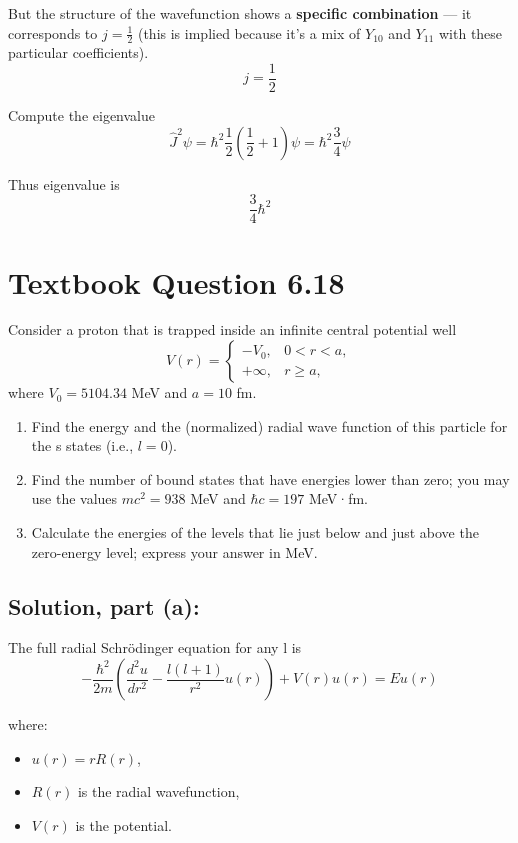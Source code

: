 \documentclass[12pt]{article}
\begin{document}
        But the structure of the wavefunction shows a \textbf{specific combination} — it corresponds to \( j=\frac{1}{2} \) (this is implied because it’s a mix of \( Y_{10} \) and \( Y_{11} \) with these particular coefficients).
        \[
            j = \frac{1}{2}
        \]
        
        Compute the eigenvalue
        \[
            \hat{J}^2 \psi = \hbar^2 \frac{1}{2}\left( \frac{1}{2} + 1 \right) \psi = \hbar^2 \frac{3}{4} \psi
        \]

        Thus eigenvalue is
        \[
            \boxed{ \frac{3}{4} \hbar^2 }
        \]


\section{Textbook Question 6.18}
    Consider a proton that is trapped inside an infinite central potential well
    \[
        V(r) = 
        \begin{cases}
        -V_0, & 0 < r < a, \\
        +\infty, & r \geq a,
        \end{cases}
    \]
    where \( V_0 = 5104.34 \) MeV and \( a = 10 \) fm.
    
    \begin{enumerate}
        \item[(a)] Find the energy and the (normalized) radial wave function of this particle for the s states (i.e., \( l = 0 \)).
        
        \item[(b)] Find the number of bound states that have energies lower than zero; you may use the values \( mc^2 = 938 \) MeV and \( \hbar c = 197 \) MeV·fm.
        
        \item[(c)] Calculate the energies of the levels that lie just below and just above the zero-energy level; express your answer in MeV.
    \end{enumerate}


    \subsection{Solution, part (a):}
        The full radial Schrödinger equation for any l is
        \[
            -\frac{\hbar^2}{2m} \left( \frac{d^2 u}{dr^2} - \frac{l(l+1)}{r^2} u(r) \right) + V(r) u(r) = E u(r)
        \]

        where:
        \begin{itemize}
            \item \( u(r) = r R(r) \),
            \item \( R(r) \) is the radial wavefunction,
            \item \( V(r) \) is the potential.
        \end{itemize}
\end{document}
